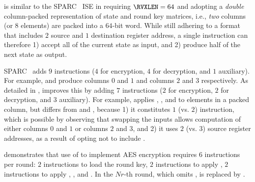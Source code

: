 
is similar to the SPARC~\cite[Page 109]{SPARC:16} ISE in
requiring
$\RVXLEN = 64$
and adopting a 
{\em double}
column-packed 
representation of state and round key matrices,
i.e., {\em two} columns (or $8$ elements) are packed into a $64$-bit word.
While still adhering to a format that
includes $2$ source and $1$ destination register address,
a single instruction can therefore 
1) accept  all  of the current state as  input,
   and
2) produce half of the next    state as output.

SPARC~\cite[Page 109]{SPARC:16}
adds
$ 9$
instructions ($4$ for encryption, $4$ for decryption, and $1$ auxiliary).
For example,
and
produce
columns $0$ and $1$
and
columns $2$ and $3$
respectively.
As detailed in
,
improves this by 
adding 
$ 7$
instructions ($2$ for encryption, $2$ for decryption, and $3$ auxiliary).
For example,
applies
, , and   
to elements in   a packed column,
but differs from 
and
,
because
1) it constitutes
   $1$ (vs. $2$)
   instruction,
   which is possible by observing that swapping the inputs allows 
   computation of either 
   columns $0$ and $1$ 
   or 
   columns $2$ and $3$,
   and
2) it uses 
   $2$ (vs. $3$)
   source register addresses, 
   as a result of opting not to include
   .

demonstrates that use of  to implement AES encryption requires
$ 6$ instructions per round:
$ 2$            
     instructions to load the round key,
$ 2$            
     instructions to apply ,
$ 2$   
     instructions to apply , , and .
In the $Nr$-th round, which omits ,
is replaced by 
     .

